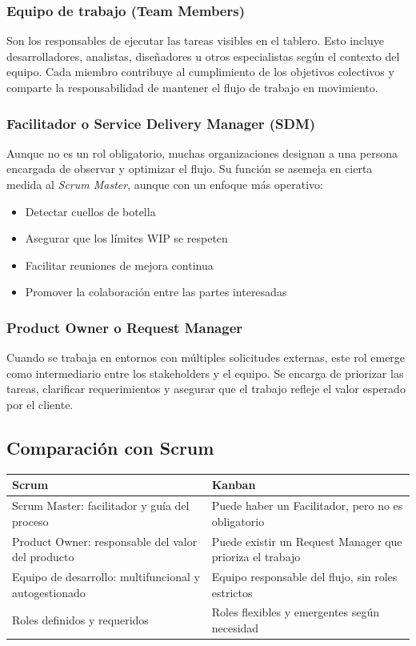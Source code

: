 \subsubsection{Equipo de trabajo (Team Members)}

Son los responsables de ejecutar las tareas visibles en el tablero. Esto incluye desarrolladores, analistas, diseñadores u otros especialistas según el contexto del equipo. Cada miembro contribuye al cumplimiento de los objetivos colectivos y comparte la responsabilidad de mantener el flujo de trabajo en movimiento.

\subsubsection{Facilitador o Service Delivery Manager (SDM)}

Aunque no es un rol obligatorio, muchas organizaciones designan a una persona encargada de observar y optimizar el flujo. Su función se asemeja en cierta medida al \textit{Scrum Master}, aunque con un enfoque más operativo:
\begin{itemize}
    \item Detectar cuellos de botella
    \item Asegurar que los límites WIP se respeten
    \item Facilitar reuniones de mejora continua
    \item Promover la colaboración entre las partes interesadas
\end{itemize}

\subsubsection{Product Owner o Request Manager}

Cuando se trabaja en entornos con múltiples solicitudes externas, este rol emerge como intermediario entre los stakeholders y el equipo. Se encarga de priorizar las tareas, clarificar requerimientos y asegurar que el trabajo refleje el valor esperado por el cliente.

\subsection{Comparación con Scrum}

\begin{longtable}{|p{5cm}|p{5cm}|}
\hline
\textbf{Scrum} & \textbf{Kanban} \\
\hline
Scrum Master: facilitador y guía del proceso & Puede haber un Facilitador, pero no es obligatorio \\
\hline
Product Owner: responsable del valor del producto & Puede existir un Request Manager que prioriza el trabajo \\
\hline
Equipo de desarrollo: multifuncional y autogestionado & Equipo responsable del flujo, sin roles estrictos \\
\hline
Roles definidos y requeridos & Roles flexibles y emergentes según necesidad \\
\hline
\end{longtable}

